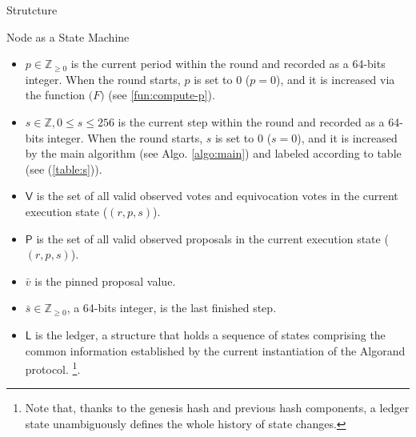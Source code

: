 \documentclass[10pt,a4paper]{article}
\begin{document}
\begin{section}{Strutcture}
\begin{subsection}{Node as a State Machine}
\begin{itemize}
    \item 
    $p\in\mathbb{Z}_{\ge 0}$ is the current {\sf period} within the round and recorded as 
    a 64-bits integer. When the round starts, $p$ is set to 0 ($p=0$), and it is 
    increased via the function $\mathcal(F)$ (see \ref{fun:compute-p}).
    
    \item 
    $s\in\mathbb{Z}, 0\le s\le 256$ is the current {\sf step} within the round 
    and recorded as a 64-bits integer. When the round starts, $s$ is set to 0 ($s=0$), 
    and it is increased by the main algorithm (see Algo. \ref{algo:main}) and 
    labeled according to table (see (\ref{table:s})).
    
    \item
    $\mathsf{V}$ is the set of all valid {\sf observed votes} and 
    {\sf equivocation votes} in the current execution state
    ($(r,p,s)$).
    
    \item
    $\mathsf{P}$ is the set of all valid {\sf observed proposals}
    in the current execution state ($(r,p,s)$).
    
    \item
    $\bar{v}$ is the {\sf pinned proposal value}.
    
    \item
    $\bar{s}\in\mathbb{Z}_{\ge 0}$, a 64-bits integer, is the {\sf last finished step}.
    
    \item
    $\mathsf{L}$ is the {\sf ledger}, a structure that holds a sequence of states comprising the common
    information established by the current instantiation of the Algorand protocol.
    \footnote{Note that, thanks to the genesis hash and previous 
    hash components, a ledger state unambiguously defines the whole history of state changes.}. 
    

\end{itemize}
\end{subsection}
\end{section}
\end{document}

